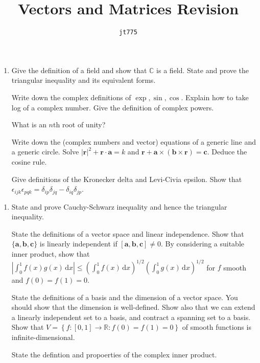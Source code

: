 \documentclass[11pt]{article}
\title{\textbf{Vectors and Matrices Revision}}
\author{\texttt{jt775}}
\date{\null}
\newcommand{\bbC}{\mathbb{C}}
\newlength{\qspace}
\newcounter{qnumber}
\newenvironment{question}%
 {\vspace{\qspace}
  \begin{enumerate}[\bfseries 1\quad][10]%
    \setcounter{enumi}{\value{qnumber}}%
    \item%
 }
{
  \end{enumerate}
  \filbreak
  \stepcounter{qnumber}
 }
\def\le{\leqslant}
\begin{document}
\maketitle
\vspace{-1.5cm}
\begin{question}
    Give the definition of a field and show that $\bbC$ is a field. State and prove the triangular inequality and its equivalent forms.

    Write down the complex definitions of $ \exp, \sin, \cos $. Explain how to take log of a complex number. Give the definition of complex powers.

    What is an $n$th root of unity?

    Write down the (complex numbers and vector) equations of a generic line and a generic circle. Solve $ |\mathbf{r}|^2+\mathbf{r}\cdot \mathbf{a}=k $ and $ \mathbf{r}+\mathbf{a} \times (\mathbf{b}\times \mathbf{r}) =\mathbf{c} $. Deduce the cosine rule.

    Give definitions of the Kronecker delta and Levi-Civia epsilon. Show that $ \epsilon_{ijk}\epsilon_{pqk}= \delta_{ip}\delta_{jq}-\delta_{iq}\delta_{jp}$.
\end{question}
\begin{question}
  State and prove Cauchy-Schwarz inequality and hence the triangular inequality.

  State the definitions of a vector space and linear independence. Show that $ \{\mathbf{a},\mathbf{b},\mathbf{c}\} $ is linearly independent if $ [\mathbf{a},\mathbf{b},\mathbf{c}]\neq 0 $. By considering a suitable inner product, show that $ \left| \int_{0}^{1} f(x)g(x) \,\mathrm{d}x \right| \le \left( \int_{0}^{1} f(x) \,\mathrm{d}x \right)^{1/2}\left( \int_{0}^{1} g(x) \,\mathrm{d}x \right)^{1/2} $ for $f$ smooth and $ f(0)=f(1)=0 $.

  State the definitions of a basis and the dimension of a vector space. You should show that the dimension is well-defined. Show also that we can extend a linearly independent set to a basis, and contract a spanning set to a basis. Show that $ V=\left\{ f:[0,1] \to \mathbb{R} :f(0)=f(1)=0\right\} $ of smooth functions is infinite-dimensional.

  State the defintion and propoerties of the complex inner product.
\end{question}
\end{document}
